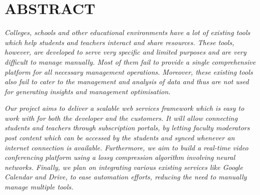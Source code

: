 \chapter*{ABSTRACT}

\emph{Colleges, schools and other educational environments have a lot of existing tools which help students and teachers interact and share resources. 
These tools, however, are developed to serve very specific and limited purposes and are very difficult to manage manually. 
Most of them fail to provide a single comprehensive platform for all necessary management operations. 
Moreover, these existing tools also fail to cater to the management and analysis of data and thus are not used for generating insights and management optimisation.}

\emph{Our project aims to deliver a scalable web services framework which is easy to work with for both the developer and the customers. 
It will allow connecting students and teachers through subscription portals, by letting faculty moderators post content which can be accessed by the students and synced whenever an internet connection is available. 
Furthermore, we aim to build a real-time video conferencing platform using a lossy compression algorithm involving neural networks. 
Finally, we plan on integrating various existing services like Google Calendar and Drive, to ease automation efforts, reducing the need to manually manage multiple tools.}
